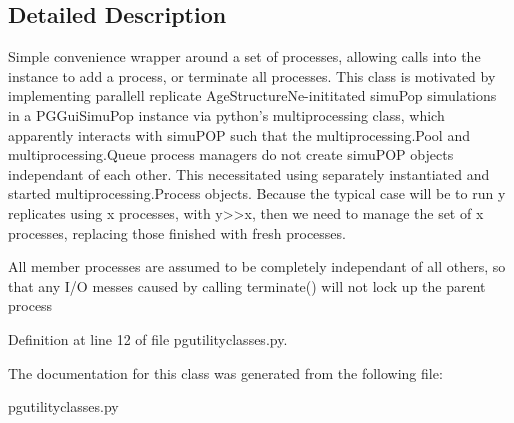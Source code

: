 \subsection{Detailed Description}
\begin{DoxyVerb}Simple convenience wrapper around a set of processes,
allowing calls into the instance to add a process,
or terminate all processes. This class is motivated
by implementing parallell replicate AgeStructureNe-inititated
simuPop simulations in a PGGuiSimuPop instance via
python's multiprocessing class, which apparently interacts
with simuPOP such that the multiprocessing.Pool and 
multiprocessing.Queue process managers do not create
simuPOP objects independant of each other.  This
necessitated using separately instantiated and started
multiprocessing.Process objects.  Because the typical
case will be to run y replicates using x processes, with
y>>x, then we need to manage the set of x processes, replacing
those finished with fresh processes.


All member processes are assumed to be completely 
independant of all others, so that any I/O messes 
caused by calling terminate() will not lock up 
the parent process
\end{DoxyVerb}
 

Definition at line 12 of file pgutilityclasses.\+py.



The documentation for this class was generated from the following file\+:\begin{DoxyCompactItemize}
\item 
pgutilityclasses.\+py\end{DoxyCompactItemize}
